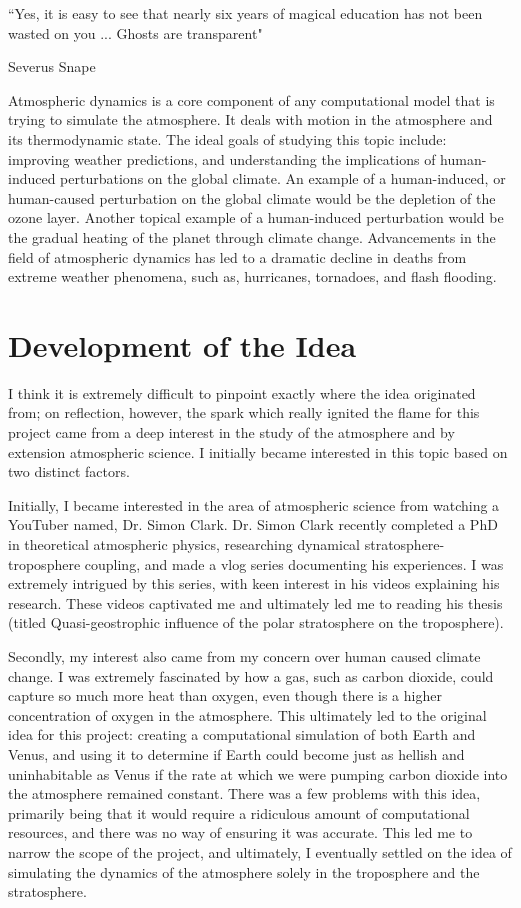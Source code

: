 \epigraph{``Yes, it is easy to see that nearly six years of magical education has not been wasted on you ... Ghosts are transparent"}{Severus Snape}

Atmospheric dynamics is a core component of any computational model that is trying to simulate the atmosphere. It deals with motion in the atmosphere and its thermodynamic state\cite{the_what}. The ideal goals of studying this topic include: improving weather predictions, and understanding the implications of human-induced perturbations on the global climate\cite{why}. An example of a human-induced, or human-caused perturbation on the global climate would be the depletion of the ozone layer\cite{perturbation}. Another topical example of a human-induced perturbation would be the gradual heating of the planet through climate change. Advancements in the field of atmospheric dynamics has led to a dramatic decline in deaths from extreme weather phenomena, such as, hurricanes, tornadoes, and flash flooding\cite{deaths}.

\section{Development of the Idea}
I think it is extremely difficult to pinpoint exactly where the idea originated from; on reflection, however, the spark which really ignited the flame for this project came from a deep interest in the study of the atmosphere and by extension atmospheric science. I initially became interested in this topic based on two distinct factors. 

Initially, I became interested in the area of atmospheric science from watching a YouTuber named, Dr. Simon Clark. Dr. Simon Clark recently completed a PhD in theoretical atmospheric physics, researching dynamical stratosphere-troposphere coupling, and made a vlog series documenting his experiences. I was extremely intrigued by this series, with keen interest in his videos explaining his research. These videos captivated me and ultimately led me to reading his thesis (titled Quasi-geostrophic influence of the polar stratosphere on the troposphere)\cite{simonclark}.

Secondly, my interest also came from my concern over human caused climate change. I was extremely fascinated by how a gas, such as carbon dioxide, could capture so much more heat than oxygen, even though there is a higher concentration of oxygen in the atmosphere. This ultimately led to the original idea for this project: creating a computational simulation of both Earth and Venus, and using it to determine if Earth could become just as hellish and uninhabitable as Venus if the rate at which we were pumping carbon dioxide into the atmosphere remained constant. There was a few problems with this idea, primarily being that it would require a ridiculous amount of computational resources, and there was no way of ensuring it was accurate. This led me to narrow the scope of the project, and ultimately, I eventually settled on the idea of simulating the dynamics of the atmosphere solely in the troposphere and the stratosphere.

